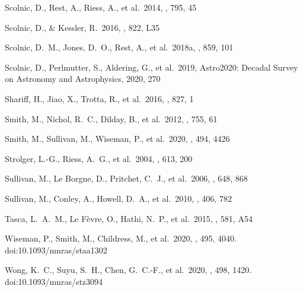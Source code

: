 \documentclass[]{aa}
\begin{document}
\begin{thebibliography}{}
 Scolnic, D., Rest, A., Riess, A., et
al.\ 2014, \apj, 795, 45

 Scolnic, D., \& Kessler, R.\
2016, \apjl, 822, L35

 Scolnic, D.~M., Jones, D.~O., Rest,
A., et al.\ 2018a, \apj, 859, 101

 Scolnic, D., Perlmutter, S.,
Aldering, G., et al.\ 2019, Astro2020: Decadal Survey on Astronomy and
Astrophysics, 2020, 270

 Shariff, H., Jiao, X., Trotta, R.,
et al.\ 2016, \apj, 827, 1

 Smith, M., Nichol, R.~C., Dilday, B., et
al.\ 2012, \apj, 755, 61

 Smith, M., Sullivan, M., Wiseman, P., et
al.\ 2020, \mnras, 494, 4426

 Strolger, L.-G., Riess, A.~G., et
al.\ 2004, \apj, 613, 200

 Sullivan, M., Le Borgne, D.,
Pritchet, C.~J., et al.\ 2006, \apj, 648, 868 

 Sullivan, M., Conley, A., Howell,
D.~A., et al.\ 2010, \mnras, 406, 782


 Tasca, L.~A.~M., Le F{\`e}vre, O.,
Hathi, N.~P., et al.\ 2015, \aap, 581, A54


 Wiseman, P., Smith, M., Childress,
M., et al.\ 2020, \mnras, 495, 4040. doi:10.1093/mnras/staa1302

 Wong, K.~C., Suyu, S.~H., Chen, G.~C.-F.,
et al.\ 2020, \mnras, 498, 1420. doi:10.1093/mnras/stz3094

\end{thebibliography}
\end{document}
